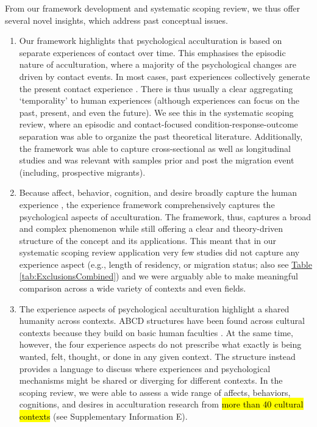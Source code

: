 \documentclass[man, 12pt, a4paper, mask]{apa7}
\newcommand{\tblref}[2][]{\hyperref[#2]{Table \ref*{#2}#1}}
\begin{document}
From our framework development and systematic scoping review, we thus offer several novel insights, which address past conceptual issues.

\begin{enumerate}
\item Our framework highlights that psychological acculturation is based on separate experiences of contact over time. This emphasises the episodic nature of acculturation, where a majority of the psychological changes are driven by contact events. In most cases, past experiences collectively generate the present contact experience \citep[also see][]{Husserl1959, Heidegger1978}. There is thus usually a clear aggregating `temporality' to human experiences (although experiences can focus on the past, present, and even the future). We see this in the systematic scoping review, where an episodic and contact-focused condition-response-outcome separation was able to organize the past theoretical literature. Additionally, the framework was able to capture cross-sectional as well as longitudinal studies and was relevant with samples prior and post the migration event (including, prospective migrants). 

\item Because affect, behavior, cognition, and desire broadly capture the human experience \citep[e.g.,][]{Jhangiani2014}, the experience framework comprehensively captures the psychological aspects of acculturation. The framework, thus, captures a broad and complex phenomenon while still offering a clear and theory-driven structure of the concept and its applications. This meant that in our systematic scoping review application very few studies did not capture any experience aspect (e.g., length of residency, or migration status; also see \tblref{tab:ExclusionsCombined}) and we were arguably able to make meaningful comparison across a wide variety of contexts and even fields.

\item The experience aspects of psychological acculturation highlight a shared humanity across contexts. ABCD structures have been found across cultural contexts because they build on basic human faculties \citep[e.g.,][]{Bhawuk2011}. At the same time, however, the four experience aspects do not prescribe what exactly is being wanted, felt, thought, or done in any given context. The structure instead provides a language to discuss where experiences and psychological mechanisms might be shared or diverging for different contexts. In the scoping review, we were able to assess a wide range of affects, behaviors, cognitions, and desires in acculturation research from \hl{more than 40 cultural contexts} (see Supplementary Information E).


\end{enumerate}
\end{document}

